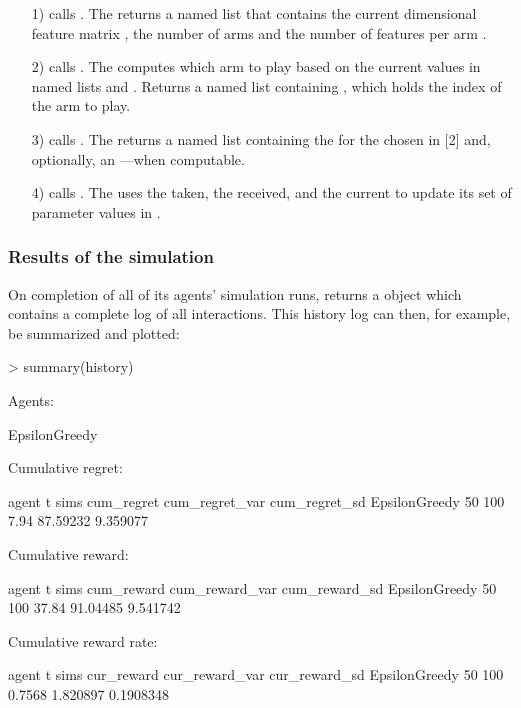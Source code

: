 \documentclass{jss}
\begin{document}
\begin{enumerate}
         \item[1)]  calls . The  returns a named list that contains the current  dimensional feature matrix , the number of arms  and the number of features per arm .
         \item[2)]  calls . The  computes which arm to play based on the current values in named lists  and . Returns a named list containing , which holds the index of the arm to play.
         \item[3)]  calls . The  returns a named list containing the  for the  chosen in [2] and, optionally, an ---when computable.
         \item[4)]  calls . The  uses the  taken, the  received, and the current  to update its set of parameter values in .
\end{enumerate}

\subsubsection{Results of the simulation}

On completion of all of its agents' simulation runs,  returns a  object which contains a complete log of all interactions. This history log can then, for example, be summarized and plotted:

\begin{CodeChunk}
\begin{CodeInput}
> summary(history)
\end{CodeInput}
\begin{CodeOutput}
Agents:

  EpsilonGreedy

Cumulative regret:

         agent  t sims cum_regret cum_regret_var cum_regret_sd
 EpsilonGreedy 50  100       7.94       87.59232      9.359077


Cumulative reward:

         agent  t sims cum_reward cum_reward_var cum_reward_sd
 EpsilonGreedy 50  100      37.84       91.04485      9.541742


Cumulative reward rate:

         agent  t sims cur_reward cur_reward_var cur_reward_sd
 EpsilonGreedy 50  100     0.7568       1.820897     0.1908348
\end{CodeOutput}
\end{CodeChunk}
\end{document}
